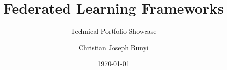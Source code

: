 \documentclass[11pt, aspectratio=169]{beamer}
\title{Federated Learning Frameworks}
\subtitle{Technical Portfolio Showcase}
\author{Christian Joseph Bunyi}
\institute{BS Computer Science}
\date{\today}
\begin{document}
\begin{frame}[plain]
    \titlepage
\end{frame}






\end{document}
